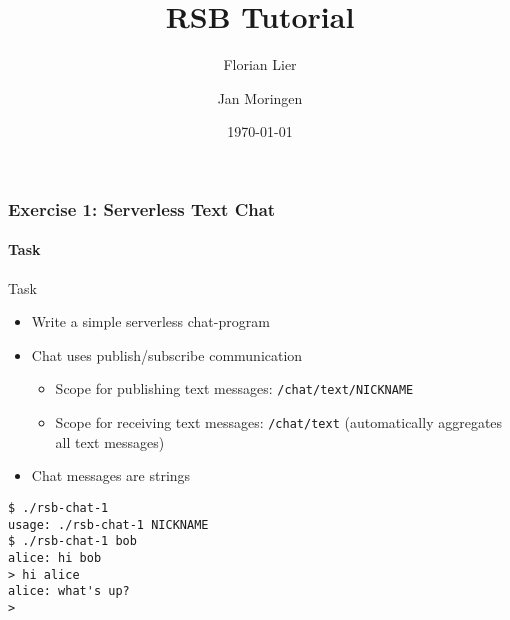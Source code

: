\documentclass[8pt, presentation]{beamer}
\institute{CLF, CoR-Lab}
\title{RSB Tutorial}
\author{Florian Lier \and Jan Moringen}
\date{\today}
\begin{document}
\maketitle



\begin{frame}
\frametitle{Exercise 1: Serverless Text Chat}
\framesubtitle{Task}
\label{sec-1}
\begin{block}{Task}
\label{sec-1-1}

\begin{itemize}
\item Write a simple serverless chat-program
\item Chat uses publish/subscribe communication
\begin{itemize}
\item Scope for publishing text messages: \texttt{/chat/text/NICKNAME}
\item Scope for receiving text messages: \texttt{/chat/text} (automatically
       aggregates all text messages)
\end{itemize}
\item Chat messages are strings
\end{itemize}
\end{block}
\begin{example}
\label{sec-1-2}


\begin{verbatim}
$ ./rsb-chat-1
usage: ./rsb-chat-1 NICKNAME
$ ./rsb-chat-1 bob
alice: hi bob
> hi alice
alice: what's up?
>
\end{verbatim}
\end{example}
\end{frame}
\end{document}
